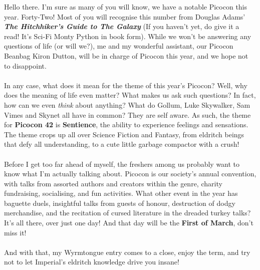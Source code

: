 Hello there. I'm sure as many of you will know, we have a notable Picocon this year. Forty-Two! Most of you will recognise this number from Douglas Adams' \textbf{\emph{The Hitchhiker's Guide to The Galaxy}} (If you haven't yet, do give it a read! It's Sci-Fi Monty Python in book form). While we won't be answering any questions of life (or will we?), me and my wonderful assistant, our Picocon Beanbag Kiron Dutton, will be in charge of Picocon this year, and we hope not to disappoint. \\ \\
In any case, what does it mean for the theme of this year's Picocon? Well, why does the meaning of life even matter? What makes us ask such questions? In fact, how can we even \emph{think} about anything? What do Gollum, Luke Skywalker, Sam Vimes and Skynet all have in common? They are self aware. As such, the theme for \textbf{Picocon 42} is \textbf{Sentience}, the ability to experience feelings and sensations. The theme crops up all over Science Fiction and Fantasy, from eldritch beings that defy all understanding, to a cute little garbage compactor with a crush! \\ \\
Before I get too far ahead of myself, the freshers among us probably want to know what I'm actually talking about. Picocon is our society's annual convention, with talks from assorted authors and creators within the genre, charity fundraising, socialising, and fun activities. What other event in the year has baguette duels, insightful talks from guests of honour\footnotemark[3]{}, destruction of dodgy merchandise, and the recitation of cursed literature in the dreaded turkey talks\footnotemark[4]{}? It's all there, over just one day! And that day will be the \textbf{First of March}, don't miss it! \\ \\
And with that, my Wyrmtongue entry comes to a close, enjoy the term, and try not to let Imperial's eldritch knowledge drive you insane!